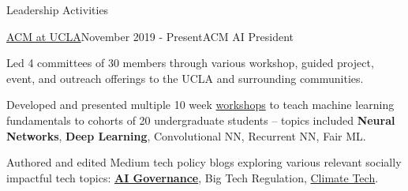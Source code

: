 \documentclass{resume}
\begin{document}
\begin{rSection}{Leadership Activities}
    \begin{rSubsection}{\href{https://www.uclaacm.com/}{ACM at UCLA}}{November 2019 - Present}{ACM AI President}
        \item Led 4 committees of 30 members through various workshop, guided project, event, and outreach offerings to the UCLA and surrounding communities.
        \item Developed and presented multiple 10 week \href{https://www.youtube.com/playlist?list=PLPO7_kXilXFYGa-3ZpOXa7Z01ZYAtUh1U}{workshops}
        to teach machine learning fundamentals to cohorts of 20 undergraduate students – topics included \textbf{Neural Networks}, \textbf{Deep Learning}, Convolutional NN, Recurrent NN, Fair ML.
        \item Authored and edited Medium tech policy blogs exploring various relevant socially impactful tech topics: \href{https://medium.com/impact-labs/considerations-for-the-future-of-ai-governance-46d727012c5b}{\bf AI Governance}, Big Tech Regulation, \href{https://medium.com/acm-at-ucla/digital-tech-for-a-greener-future-7bc7f2e00bda}{Climate Tech}.
    \end{rSubsection}
\end{rSection}
\end{document}
